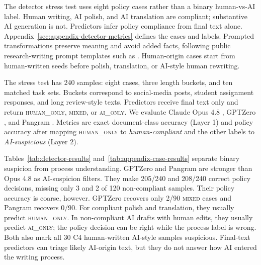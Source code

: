 \documentclass[11pt]{article}
\begin{document}
The detector stress test uses eight policy cases rather than a binary human-vs-AI label. Human writing, AI polish, and AI translation are compliant; substantive AI generation is not. Predictors infer policy compliance from final text alone. Appendix~\ref{sec:appendix-detector-metrics} defines the cases and labels. Prompted transformations preserve meaning and avoid added facts, following public research-writing prompt templates such as \citet{leey2026awesomewriting}. Human-origin cases start from human-written seeds before polish, translation, or AI-style human rewriting.

The stress test has 240 samples: eight cases, three length buckets, and ten matched task sets. Buckets correspond to social-media posts, student assignment responses, and long review-style texts. Predictors receive final text only and return \textsc{human\_only}, \textsc{mixed}, or \textsc{ai\_only}. We evaluate Claude Opus 4.8 \citep{anthropic2026opus48}, GPTZero \citep{gptzero2026detector}, and Pangram \citep{pangram2026detector}. Metrics are exact document-class accuracy (Layer 1) and policy accuracy after mapping \textsc{human\_only} to \textit{human-compliant} and the other labels to \textit{AI-suspicious} (Layer 2).

\begin{table}[t]
\small
\centering
\setlength{\tabcolsep}{3pt}
\caption{Final-text-only predictor results. Document accuracy is exact three-class agreement with the expected final-text class. Policy accuracy maps \textsc{mixed} and \textsc{ai\_only} predictions to AI-suspicious, then scores agreement with the benchmark policy.}
\label{tab:detector-results}
\end{table}

Tables~\ref{tab:detector-results} and~\ref{tab:appendix-case-results} separate binary suspicion from process understanding. GPTZero and Pangram are stronger than Opus 4.8 as AI-suspicion filters. They make 205/240 and 208/240 correct policy decisions, missing only 3 and 2 of 120 non-compliant samples. Their policy accuracy is coarse, however. GPTZero recovers only 2/90 \textsc{mixed} cases and Pangram recovers 0/90. For compliant polish and translation, they usually predict \textsc{human\_only}. In non-compliant AI drafts with human edits, they usually predict \textsc{ai\_only}; the policy decision can be right while the process label is wrong. Both also mark all 30 C4 human-written AI-style samples suspicious. Final-text predictors can triage likely AI-origin text, but they do not answer how AI entered the writing process.
\end{document}
